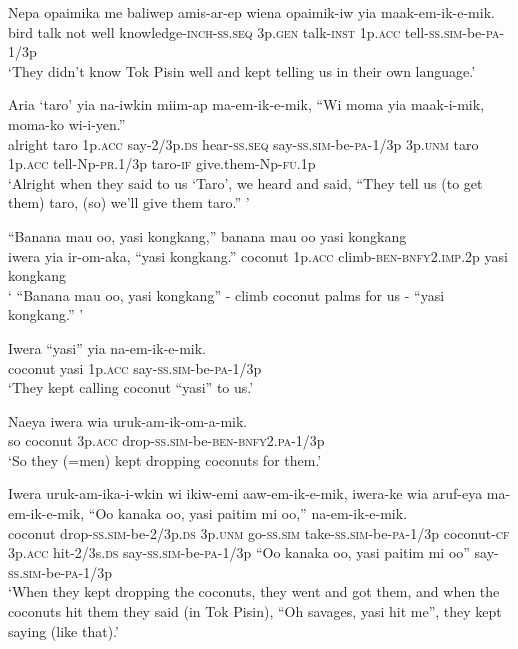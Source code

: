 \ea
\gll  Nepa  opaimika  me  baliwep  amis-ar-ep wiena  opaimik-iw  yia  maak-em-ik-e-mik. \\
bird  talk  not  well  knowledge-\textsc{inch}-\textsc{ss.seq} 3p.\textsc{gen}  talk-\textsc{inst}  1p.\textsc{acc}  tell-\textsc{ss}.\textsc{sim}-be-\textsc{pa}-1/3p\\ 
\glt ‘They didn’t know Tok Pisin well and kept telling us in their own language.’ \\
\z


\ea
\gll  Aria  ‘taro’  yia  na-iwkin  miim-ap ma-em-ik-e-mik,  “Wi  moma  yia  maak-i-mik,  moma-ko  wi-i-yen.” \\
alright  taro  1p.\textsc{acc}  say-2/3p.\textsc{ds}  hear-\textsc{ss.seq} say-\textsc{ss}.\textsc{sim}-be-\textsc{pa}-1/3p  3p.\textsc{unm}  taro  1p.\textsc{acc} tell-Np-\textsc{pr}.1/3p  taro-\textsc{if}  give.them-Np-\textsc{fu}.1p \\
\glt ‘Alright when they said to us ‘Taro’, we heard and said, “They tell us (to get them) taro, (so) we’ll give them taro.” ’ \\
\z


\ea
\gll  “Banana  mau  oo,  yasi  kongkang,” banana  mau  oo  yasi  kongkang\\ 
iwera  yia  ir-om-aka,  “yasi  kongkang.” coconut  1p.\textsc{acc}  climb-\textsc{ben}-\textsc{bnfy}2.\textsc{imp}.2p  yasi  kongkang  \\ 
\glt ‘ “Banana mau oo, yasi kongkang” - climb coconut palms for us - “yasi kongkang.” ’ \\
\z


\ea
\gll  Iwera  “yasi”  yia  na-em-ik-e-mik. \\
coconut  yasi  1p.\textsc{acc}  say-\textsc{ss}.\textsc{sim}-be-\textsc{pa}-1/3p \\
\glt ‘They kept calling coconut “yasi” to us.’ \\
\z


\ea
\gll  Naeya  iwera  wia  uruk-am-ik-om-a-mik. \\
so  coconut  3p.\textsc{acc}  drop-\textsc{ss}.\textsc{sim}-be-\textsc{ben}-\textsc{bnfy}2.\textsc{pa}-1/3p \\
\glt ‘So they (=men) kept dropping coconuts for them.’ \\
\z


\ea
\gll  Iwera  uruk-am-ika-i-wkin  wi  ikiw-emi  aaw-em-ik-e-mik,  iwera-ke  wia  aruf-eya   ma-em-ik-e-mik,  “Oo  kanaka  oo,  yasi  paitim  mi  oo,” na-em-ik-e-mik. \\
coconut  drop-\textsc{ss}.\textsc{sim}-be-2/3p.\textsc{ds}  3p.\textsc{unm}  go-\textsc{ss}.\textsc{sim} take-\textsc{ss}.\textsc{sim}-be-\textsc{pa}-1/3p  coconut-\textsc{cf}  3p.\textsc{acc}  hit-2/3s.\textsc{ds} say-\textsc{ss}.\textsc{sim}-be-\textsc{pa}-1/3p  “Oo  kanaka  oo,  yasi  paitim  mi  oo” say-\textsc{ss}.\textsc{sim}-be-\textsc{pa}-1/3p\\
\glt ‘When they kept dropping the coconuts, they went and got them, and when the coconuts hit them they said (in Tok Pisin), “Oh savages, yasi hit me”, they kept saying (like that).’ \\
\z


